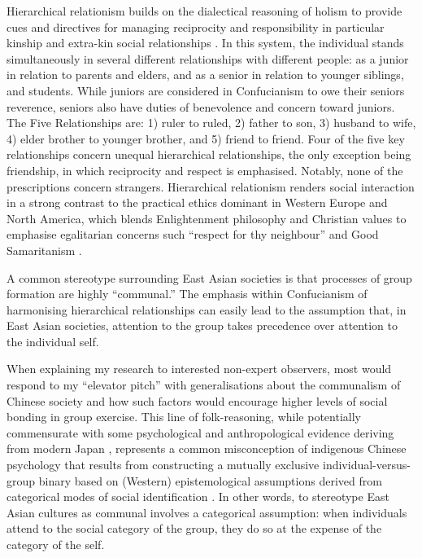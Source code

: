 \begin{CJK}{UTF8}{gbsn}
Hierarchical relationism builds on the dialectical reasoning of holism to provide cues and directives for managing reciprocity and responsibility in particular kinship and extra-kin social relationships \citep[\textit{renqing} 人情: ][]{Maehr1980}.   In this system, the individual stands simultaneously in several different relationships with different people: as a junior in relation to parents and elders, and as a senior in relation to younger siblings, and students. While juniors are considered in Confucianism to owe their seniors reverence, seniors also have duties of benevolence and concern toward juniors. The Five Relationships are: 1) ruler to ruled, 2) father to son, 3) husband to wife, 4) elder brother to younger brother, and 5) friend to friend. Four of the five key relationships concern unequal hierarchical relationships, the only exception being friendship, in which reciprocity and respect is emphasised.  Notably, none of the prescriptions concern strangers.  Hierarchical relationism renders social interaction in a strong contrast to the practical ethics dominant in Western Europe and North America, which blends Enlightenment philosophy and Christian values to emphasise egalitarian concerns such ``respect for thy neighbour'' and Good Samaritanism \citep{Liu2005}.

A common stereotype surrounding East Asian societies is that processes of group formation are highly ``communal.''  The emphasis within Confucianism of harmonising hierarchical relationships can easily lead to the assumption that, in East Asian societies, attention to the group takes precedence over attention to the individual self.

When explaining my research to interested non-expert observers, most would respond to my ``elevator pitch'' with generalisations about the communalism of Chinese society and how such factors would encourage higher levels of social bonding in group exercise.  This line of folk-reasoning, while potentially commensurate with some psychological and anthropological evidence deriving from modern Japan \citep{Kitayama2010a}, represents a common misconception of indigenous Chinese psychology that results from constructing a mutually exclusive individual-versus-group binary based on (Western) epistemological assumptions derived from categorical modes of social identification \citep{Tu1998}.  In other words, to stereotype East Asian cultures as communal involves a categorical assumption: when individuals attend to the social category of the group, they do so at the expense of the category of the self.


\end{CJK}
